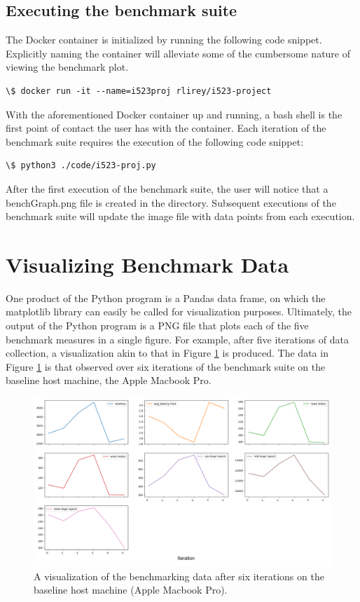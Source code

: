 \documentclass[sigconf]{acmart}
\begin{document}
\subsection{Executing the benchmark suite}
The Docker container is initialized by running the following code snippet. Explicitly naming the container will alleviate some of the cumbersome nature of viewing the benchmark plot.

\begin{lstlisting}
\$ docker run -it --name=i523proj rlirey/i523-project
\end{lstlisting}

With the aforementioned Docker container up and running, a bash shell is the first point of contact the user has with the container. Each iteration of the benchmark suite requires the execution of the following code snippet:

\begin{lstlisting}
\$ python3 ./code/i523-proj.py
\end{lstlisting}

After the first execution of the benchmark suite, the user will notice that a benchGraph.png file is created in the directory. Subsequent executions of the benchmark suite will update the image file with data points from each execution.

\section{Visualizing Benchmark Data}

One product of the Python program is a Pandas data frame, on which the matplotlib library can easily be called for visualization purposes. Ultimately, the output of the Python program is a PNG file that plots each of the five benchmark measures in a single figure. For example, after five iterations of data collection, a visualization akin to that in Figure \ref{f:plotMBP} is produced. The data in Figure \ref{f:plotMBP} is that observed over six iterations of the benchmark suite on the baseline host machine, the Apple Macbook Pro.

\begin{figure}[!ht]
  \centering\includegraphics[width=\columnwidth]{images/samplePlot.png}
  \caption{A visualization of the benchmarking data after six iterations on the baseline host machine (Apple Macbook Pro).}\label{f:plotMBP}
\end{figure}
\end{document}
